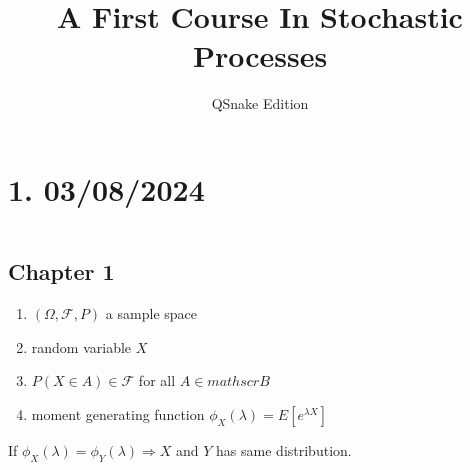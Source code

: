




\title{A First Course In Stochastic Processes}

\author{QSnake Edition}

\maketitle



\section*{1. 03/08/2024}$ $

\subsection*{Chapter 1}

\begin{enumerate}
	\item $(\Omega,\mathscr{F},P)$ a sample space
	\item random variable $X$
	\item $P(X \in A) \in \mathscr{F}$ for all $A \in mathscr{B}$
	\item moment generating function $\phi_X(\lambda) = E[e^{\lambda X}]$
\end{enumerate}


\begin{prop*}
	If $\phi_X(\lambda) = \phi_Y(\lambda) \Rightarrow X$ and $Y$ has same distribution.
\end{prop*}

